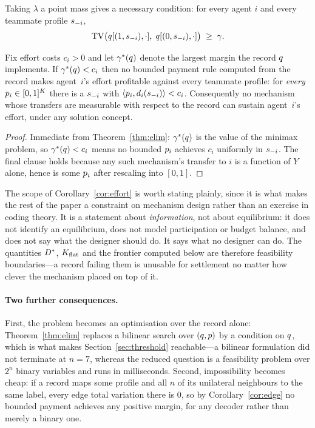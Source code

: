 \begin{corollary}
\label{cor:edge}
Taking $\lambda$ a point mass gives a necessary condition: for every agent $i$
and every teammate profile $s_{-i}$,
\[
  \mathrm{TV}\bigl(q[(1,s_{-i}),\cdot],\; q[(0,s_{-i}),\cdot]\bigr) \;\ge\; \gamma .
\]
\end{corollary}

\begin{corollary}
\label{cor:effort}
Fix effort costs $c_i > 0$ and let $\gamma^\ast(q)$ denote the largest margin
the record $q$ implements. If $\gamma^\ast(q) < c_i$ then no bounded
payment rule computed from the record makes agent~$i$'s effort profitable
against every teammate profile: for \emph{every} $p_i \in [0,1]^K$ there is a
$s_{-i}$ with $\langle p_i, d_i(s_{-i})\rangle < c_i$. Consequently no
mechanism whose transfers are measurable with respect to the record can sustain
agent~$i$'s effort, under any solution concept.
\end{corollary}

\begin{proof}
Immediate from Theorem~\ref{thm:elim}: $\gamma^\ast(q)$ is the value of the
minimax problem, so $\gamma^\ast(q) < c_i$ means no bounded $p_i$ achieves
$c_i$ uniformly in $s_{-i}$. The final clause holds because any such mechanism's
transfer to $i$ is a function of $Y$ alone, hence is some $p_i$ after
rescaling into $[0,1]$.
\end{proof}

The scope of Corollary~\ref{cor:effort} is worth stating plainly, since it is
what makes the rest of the paper a constraint on mechanism design rather than an
exercise in coding theory. It is a statement about \emph{information}, not about
equilibrium: it does not identify an equilibrium, does not model participation or
budget balance, and does not say what the designer should do. It says what no
designer can do. The quantities $D^\ast$, $K_{\mathrm{flat}}$ and the frontier computed below
are therefore feasibility boundaries---a record failing them is unusable for
settlement no matter how clever the mechanism placed on top of it.

\paragraph{Two further consequences.}
First, the problem becomes an optimisation over the record alone:
Theorem~\ref{thm:elim} replaces a bilinear search over $(q,p)$ by a
condition on $q$, which is what makes Section~\ref{sec:threshold} reachable---a
bilinear formulation did not terminate at $n = 7$, whereas the reduced question
is a feasibility problem over $2^n$ binary variables and runs in milliseconds.
Second, impossibility becomes cheap: if a record maps some profile and all $n$ of
its unilateral neighbours to the same label, every edge total variation there is
$0$, so by Corollary~\ref{cor:edge} no bounded payment achieves any positive
margin, for any decoder rather than merely a binary one.

